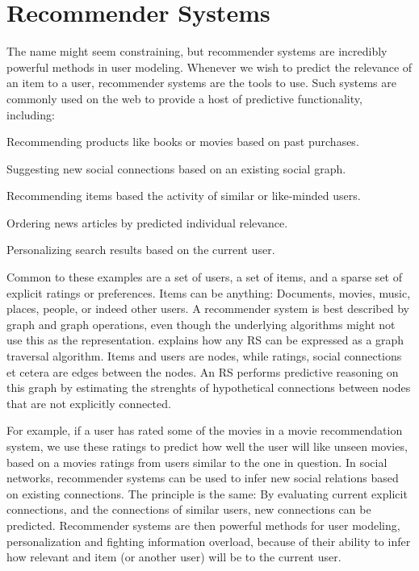 \section{Recommender Systems}
\label{sec:recommender}

The name might seem constraining, but recommender systems are incredibly powerful methods in user modeling.
Whenever we wish to predict the relevance of an item to a user, recommender systems are the tools to use.
Such systems are commonly used on the web to provide a host of predictive functionality, including:

\begin{itemize*}
  \item Recommending products like books or movies based on past purchases.
  \item Suggesting new social connections based on an existing social graph.
  \item Recommending items based the activity of similar or like-minded users.
  \item Ordering news articles by predicted individual relevance.
  \item Personalizing search results based on the current user.
\end{itemize*}

Common to these examples are a set of users, a set of items, and a sparse set of explicit ratings or preferences.
Items can be anything: Documents, movies, music, places, people, or indeed other users.
A recommender system is best described by graph and graph operations, even though the underlying algorithms might not use this as the representation.
\cite{Mirza2003} explains how any RS can be expressed as a graph traversal algorithm.
Items and users are nodes, while ratings, social connections et cetera are edges between the nodes.
An RS performs predictive reasoning on this graph by estimating the strenghts of hypothetical connections between nodes that are not explicitly connected.

For example, if a user has rated some of the movies in a movie recommendation system, 
we use these ratings to predict how well the user will like unseen movies,
based on a movies ratings from users similar to the one in question.
In social networks, recommender systems can be used to infer new social relations 
based on existing connections. The principle is the same: By evaluating current explicit
connections, and the connections of similar users, new connections can be predicted.
Recommender systems are then powerful methods for user modeling, personalization and fighting information overload,
because of their ability to infer how relevant and item (or another user) will be to the current user.

